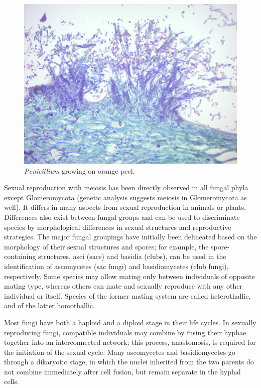 \begin{figure}

{\centering \includegraphics[width=0.7\linewidth]{./figures/fungi/penicillium_orange}

}

\caption{\emph{Penicillium} growing on orange peel.}\label{fig:orange}
\end{figure}

Sexual reproduction with meiosis has been directly observed in all
fungal phyla except Glomeromycota (genetic analysis suggests meiosis in
Glomeromycota as well). It differs in many aspects from sexual
reproduction in animals or plants. Differences also exist between fungal
groups and can be used to discriminate species by morphological
differences in sexual structures and reproductive strategies. The major
fungal groupings have initially been delineated based on the morphology
of their sexual structures and spores; for example, the spore-containing
structures, asci (sacs) and basidia (clubs), can be used in the
identification of ascomycetes (sac fungi) and basidiomycetes (club
fungi), respectively. Some species may allow mating only between
individuals of opposite mating type, whereas others can mate and
sexually reproduce with any other individual or itself. Species of the
former mating system are called heterothallic, and of the latter
homothallic.

Most fungi have both a haploid and a diploid stage in their life cycles.
In sexually reproducing fungi, compatible individuals may combine by
fusing their hyphae together into an interconnected network; this
process, anastomosis, is required for the initiation of the sexual
cycle. Many ascomycetes and basidiomycetes go through a dikaryotic
stage, in which the nuclei inherited from the two parents do not combine
immediately after cell fusion, but remain separate in the hyphal cells.


